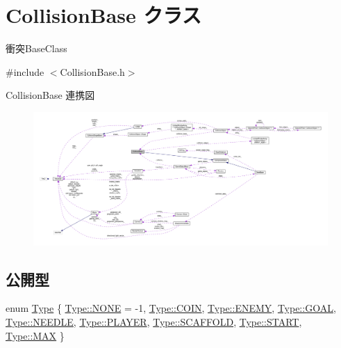 \hypertarget{class_collision_base}{}\section{Collision\+Base クラス}
\label{class_collision_base}


衝突\+Base\+Class  




{\ttfamily \#include $<$Collision\+Base.\+h$>$}



Collision\+Base 連携図\nopagebreak
\begin{figure}[H]
\begin{center}
\leavevmode
\includegraphics[width=350pt]{class_collision_base__coll__graph}
\end{center}
\end{figure}
\subsection*{公開型}
\begin{DoxyCompactItemize}
\item 
enum \mbox{\hyperlink{class_collision_base_a18dc0d5461742083ca12013fe9ff1a20}{Type}} \{ \newline
\mbox{\hyperlink{class_collision_base_a18dc0d5461742083ca12013fe9ff1a20ab50339a10e1de285ac99d4c3990b8693}{Type\+::\+N\+O\+NE}} = -\/1, 
\mbox{\hyperlink{class_collision_base_a18dc0d5461742083ca12013fe9ff1a20a25361d987423542afaf03cacdc76932f}{Type\+::\+C\+O\+IN}}, 
\mbox{\hyperlink{class_collision_base_a18dc0d5461742083ca12013fe9ff1a20a92b09d1635332c90ae8508618a174244}{Type\+::\+E\+N\+E\+MY}}, 
\mbox{\hyperlink{class_collision_base_a18dc0d5461742083ca12013fe9ff1a20a007a3c4175ca4f86d9dc49e4f2e9cf8a}{Type\+::\+G\+O\+AL}}, 
\newline
\mbox{\hyperlink{class_collision_base_a18dc0d5461742083ca12013fe9ff1a20aa83b0c6dce47bd516f6026cfcfe5161d}{Type\+::\+N\+E\+E\+D\+LE}}, 
\mbox{\hyperlink{class_collision_base_a18dc0d5461742083ca12013fe9ff1a20a07c80e2a355d91402a00d82b1fa13855}{Type\+::\+P\+L\+A\+Y\+ER}}, 
\mbox{\hyperlink{class_collision_base_a18dc0d5461742083ca12013fe9ff1a20a51bef7d3e9034aacc642d5dcf359db86}{Type\+::\+S\+C\+A\+F\+F\+O\+LD}}, 
\mbox{\hyperlink{class_collision_base_a18dc0d5461742083ca12013fe9ff1a20ab078ffd28db767c502ac367053f6e0ac}{Type\+::\+S\+T\+A\+RT}}, 
\newline
\mbox{\hyperlink{class_collision_base_a18dc0d5461742083ca12013fe9ff1a20a26a4b44a837bf97b972628509912b4a5}{Type\+::\+M\+AX}}
 \}
\end{DoxyCompactItemize}
